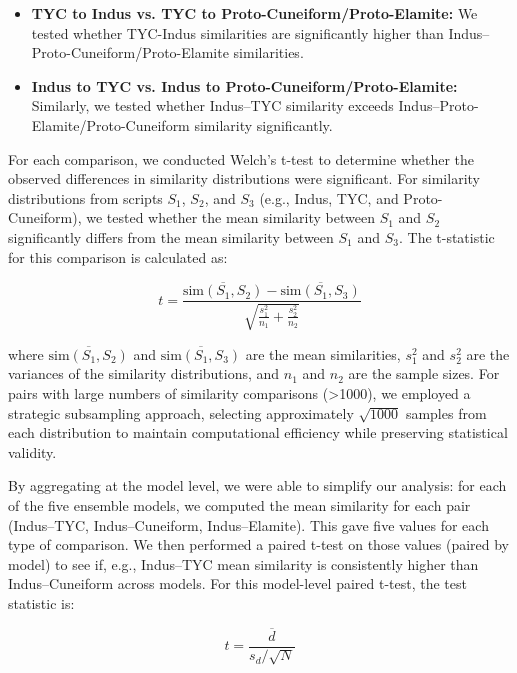 \documentclass[11pt,a4paper,oneside]{report}
\begin{document}
\begin{itemize}
    \item \textbf{TYC to Indus vs. TYC to Proto-Cuneiform/Proto-Elamite:} We tested whether TYC-Indus similarities are significantly higher than Indus–Proto-Cuneiform/Proto-Elamite similarities.
    \item \textbf{Indus to TYC vs. Indus to Proto-Cuneiform/Proto-Elamite:} Similarly, we tested whether Indus–TYC similarity exceeds Indus–Proto-Elamite/Proto-Cuneiform similarity significantly.
\end{itemize}

For each comparison, we conducted Welch's t-test \cite{welch_generalization_1947} to determine whether the observed differences in similarity distributions were significant. For similarity distributions from scripts $S_1$, $S_2$, and $S_3$ (e.g., Indus, TYC, and Proto-Cuneiform), we tested whether the mean similarity between $S_1$ and $S_2$ significantly differs from the mean similarity between $S_1$ and $S_3$. The t-statistic for this comparison is calculated as:

\begin{equation}
t = \frac{\overline{\text{sim}(S_1, S_2)} - \overline{\text{sim}(S_1, S_3)}}{\sqrt{\frac{s_1^2}{n_1} + \frac{s_2^2}{n_2}}}
\end{equation}

where $\overline{\text{sim}(S_1, S_2)}$ and $\overline{\text{sim}(S_1, S_3)}$ are the mean similarities, $s_1^2$ and $s_2^2$ are the variances of the similarity distributions, and $n_1$ and $n_2$ are the sample sizes. For pairs with large numbers of similarity comparisons (>1000), we employed a strategic subsampling approach, selecting approximately $\sqrt{1000}$ samples from each distribution to maintain computational efficiency while preserving statistical validity.

By aggregating at the model level, we were able to simplify our analysis: for each of the five ensemble models, we computed the mean similarity for each pair (Indus–TYC, Indus–Cuneiform, Indus–Elamite). This gave five values for each type of comparison. We then performed a paired t-test on those values (paired by model) to see if, e.g., Indus–TYC mean similarity is consistently higher than Indus–Cuneiform across models. For this model-level paired t-test, the test statistic is:

\begin{equation}
t = \frac{\overline{d}}{s_d / \sqrt{N}}
\end{equation}
\end{document}
